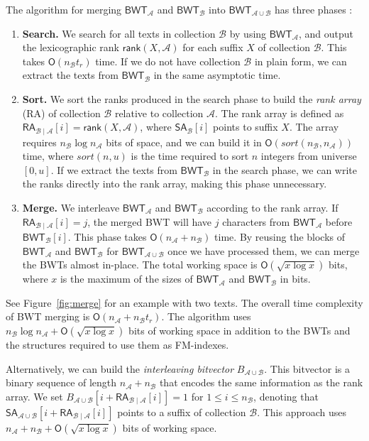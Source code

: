 \documentclass[smallabstract,smallcaptions]{dccpaper}
\newcommand{\Oh}{\ensuremath{\mathsf{O}}}
\newcommand{\BWT}{\textsf{BWT}}
\newcommand{\RA}{\textsf{RA}}
\newcommand{\mSA}{\ensuremath{\mathsf{SA}}}
\newcommand{\mBWT}{\ensuremath{\mathsf{BWT}}}
\newcommand{\mRA}{\ensuremath{\mathsf{RA}}}
\newcommand{\mrank}{\ensuremath{\mathsf{rank}}}
\newcommand{\Acoll}{\ensuremath{\mathcal{A}}}
\newcommand{\Bcoll}{\ensuremath{\mathcal{B}}}
\begin{document}
The algorithm for merging $\mBWT_{\Acoll}$ and $\mBWT_{\Bcoll}$ into $\mBWT_{\Acoll \cup \Bcoll}$ has three phases \cite{Siren2009}:
\begin{enumerate}

\item \textbf{Search.} We search for all texts in collection $\Bcoll$ by using $\mBWT_{\Acoll}$, and output the lexicographic rank $\mrank(X, \Acoll)$ for each suffix $X$ of collection $\Bcoll$. This takes $\Oh(n_{\Bcoll} t_{r})$ time. If we do not have collection $\Bcoll$ in plain form, we can extract the texts from $\mBWT_{\Bcoll}$ in the same asymptotic time.

\item \textbf{Sort.} We sort the ranks produced in the search phase to build the \emph{rank array} (\RA) of collection $\Bcoll$ relative to collection $\Acoll$. The rank array is defined as $\mRA_{\Bcoll \mid \Acoll}[i] = \mrank(X, \Acoll)$, where $\mSA_{\Bcoll}[i]$ points to suffix $X$. The array requires $n_{\Bcoll} \log n_{\Acoll}$ bits of space, and we can build it in $\Oh(sort(n_{\Bcoll}, n_{\Acoll}))$ time, where $sort(n, u)$ is the time required to sort $n$ integers from universe $[0,u]$. If we extract the texts from $\mBWT_{\Bcoll}$ in the search phase, we can write the ranks directly into the rank array, making this phase unnecessary.

\item \textbf{Merge.} We interleave $\mBWT_{\Acoll}$ and $\mBWT_{\Bcoll}$ according to the rank array. If $\mRA_{\Bcoll \mid \Acoll}[i] = j$, the merged \BWT{} will have $j$ characters from $\mBWT_{\Acoll}$ before $\mBWT_{\Bcoll}[i]$. This phase takes $\Oh(n_{\Acoll} + n_{\Bcoll})$ time. By reusing the blocks of $\mBWT_{\Acoll}$ and $\mBWT_{\Bcoll}$ for $\mBWT_{\Acoll \cup \Bcoll}$ once we have processed them, we can merge the \BWT{}s almost in-place. The total working space is $\Oh(\sqrt{x \log x})$ bits, where $x$ is the maximum of the sizes of $\mBWT_{\Acoll}$ and $\mBWT_{\Bcoll}$ in bits.

\end{enumerate}
See Figure~\ref{fig:merge} for an example with two texts. The overall time complexity of \BWT{} merging is $\Oh(n_{\Acoll} + n_{\Bcoll} t_{r})$. The algorithm uses $n_{\Bcoll} \log n_{\Acoll} + \Oh(\sqrt{x \log x})$ bits of working space in addition to the \BWT{}s and the structures required to use them as FM-indexes.

Alternatively, we can build the \emph{interleaving bitvector} $B_{\Acoll \cup \Bcoll}$. This bitvector is a binary sequence of length $n_{\Acoll} + n_{\Bcoll}$ that encodes the same information as the rank array. We set $B_{\Acoll \cup \Bcoll}[i + \mRA_{\Bcoll \mid \Acoll}[i]] = 1$ for $1 \le i \le n_{\Bcoll}$, denoting that $\mSA_{\Acoll \cup \Bcoll}[i + \mRA_{\Bcoll \mid \Acoll}[i]]$ points to a suffix of collection $\Bcoll$. This approach uses $n_{\Acoll} + n_{\Bcoll} + \Oh(\sqrt{x \log x})$ bits of working space.
\end{document}
